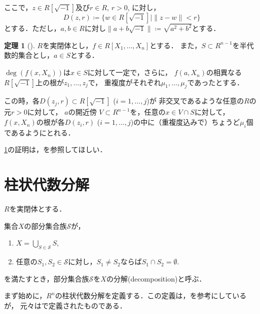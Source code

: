 \documentclass[uplatex, dvipdfmx]{jsarticle}
\numberwithin{equation}{section}
\newcommand{\norm}[1]{\| {#1} \|}
\theoremstyle{definition}
\newtheorem{theorem}[definition]{定理}
\begin{document}
ここで，$z \in R\left[ \sqrt{-1} \right]$及び$r \in R$, $r>0$, に対し，
\begin{equation}
     D(z, r)\coloneqq \{w \in R\left[\sqrt{-1}\right] \mid \norm{z - w} < r\}
\end{equation}
とする．ただし，$a,b \in R$に対し$\norm{a + b\sqrt{-1}} \coloneqq \sqrt{a^2 + b^2}$とする．

\begin{theorem}[{\cite[Theorem 5.12]{MR2248869}}] \label{theorem:continuity-of-roots}
     $R$を実閉体とし，$f \in R[X_1, \dots, X_n]$とする．
     また，$S \subset R^{n-1}$を半代数的集合とし，$a \in S$とする．

     $\deg (f(x,X_n))$は$x \in S$に対して一定で，さらに，
     $f(a,X_n)$の相異なる$R\left[\sqrt{-1} \right]$上の根が$z_1, \dots, z_j$で，
     重複度がそれぞれ$\mu_1, \dots, \mu_j$であったとする．

     この時，各$D(z_j, r) \subset R\left[ \sqrt{-1} \right]$ ($i=1, \dots, j$)が
     非交叉であるような任意の$R$の元$r > 0$に対して，
     $a$の開近傍 $V \subset R^{n-1}$を，任意の$x \in V \cap S$に対して，
     $f(x, X_n)$の根が各$D(z_i, r)$ ($i=1, \dots, j$)の中に（重複度込みで）ちょうど$\mu_i$個であるようにとれる．
\end{theorem}

\cref{theorem:continuity-of-roots}の証明は，\cite[Theorem 5.12]{MR2248869}を参照してほしい．


\section{柱状代数分解}

$R$を実閉体とする．

集合$X$の部分集合族$\mathcal{S}$が，
\begin{enumerate}
     \item $X = \bigcup_{S \in \mathcal{S}} S$,
     \item 任意の$S_1, S_2 \in \mathcal{S}$に対し，$S_1 \neq S_2$ならば$S_1 \cap S_2 = \emptyset$.
\end{enumerate}
を満たすとき，部分集合族$\mathcal{S}$を$X$の分解(decomposition)と呼ぶ．

まず始めに，$R^n$の柱状代数分解を定義する．この定義は，\cite[Definition 5.1]{MR2248869}を参考にしているが，
元々は\cite[section 3]{MR0403962}で定義されたものである．
\end{document}
